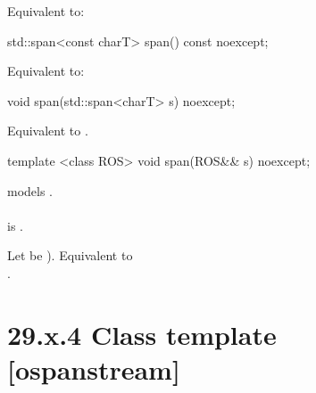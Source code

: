 \documentclass[ebook,11pt,article]{memoir}
\begin{document}
\begin{itemdescr}
\pnum
\effects Equivalent to:\\
\end{itemdescr}

\begin{itemdecl}
std::span<const charT> span() const noexcept;
\end{itemdecl}

\begin{itemdescr}
\pnum
\effects Equivalent to:\\
\end{itemdescr}

\begin{itemdecl}
void span(std::span<charT> s) noexcept;
\end{itemdecl}

\begin{itemdescr}
\pnum
\effects
Equivalent to
.
\end{itemdescr}




\begin{itemdecl}
template <class ROS>
void span(ROS&& s) noexcept;
\end{itemdecl}

\begin{itemdescr}
\pnum
\constraints
{} models .\\
\\  is .
 
\pnum
\effects
Let  be ). 
Equivalent to \\
.
\end{itemdescr}



\section{29.x.4 Class template  [ospanstream] }
\end{document}
